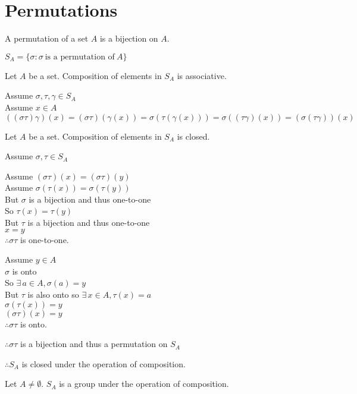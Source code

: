 \documentclass[letterpaper,12pt,fleqn]{article}
\renewcommand{\o}{\sigma}
\renewcommand{\t}{\tau}
\newcommand{\g}{\gamma}
\begin{document}
\section*{Permutations}

\begin{definition}
  A permutation of a set $A$ is a bijection on $A$.

  $S_A=\{\o:\o\ \mbox{is a permutation of}\ A\}$
\end{definition}

\begin{lemma}
  Let $A$ be a set. Composition of elements in $S_A$ is associative.
\end{lemma}

\begin{theproof}
  Assume $\o,\t,\g\in S_A$ \\
  Assume $x\in A$ \\
  $ ((\o\t)\g)(x)=(\o\t)(\g(x))=\o(\t(\g(x)))=\o((\t\g)(x))=(\o(\t\g))(x)$
\end{theproof}

\begin{lemma}
  Let $A$ be a set. Composition of elements in $S_A$ is closed.
\end{lemma}

\begin{theproof}
  Assume $\o,\t\in S_A$

  Assume $(\o\t)(x)=(\o\t)(y)$ \\
  Assume $\o(\t(x))=\o(\t(y))$ \\
  But $\o$ is a bijection and thus one-to-one \\
  So $\t(x)=\t(y)$ \\
  But $\t$ is a bijection and thus one-to-one \\
  $x=y$ \\
  $\therefore \o\t$ is one-to-one.

  Assume $y\in A$ \\
  $\o$ is onto \\
  So $\exists\,a\in A,\o(a)=y$ \\
  But $\t$ is also onto so $\exists\,x\in A,\t(x)=a$ \\
  $\o(\t(x))=y$ \\
  $(\o\t)(x)=y$ \\
  $\therefore \o\t$ is onto.

  $\therefore \o\t$ is a bijection and thus a permutation on $S_A$

  $\therefore S_A$ is closed under the operation of composition.
\end{theproof}
\newpage
\begin{theorem}
  Let $A\ne\emptyset$. $S_A$ is a group under the operation of composition.
\end{theorem}
\end{document}
